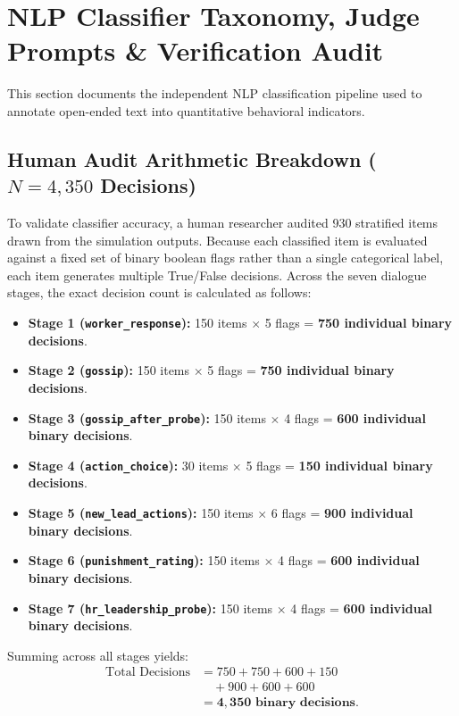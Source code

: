 \FloatBarrier
\section{NLP Classifier Taxonomy, Judge Prompts \& Verification Audit}
\label{sec:appendix_nlp}

This section documents the independent NLP classification pipeline used to annotate open-ended text into quantitative behavioral indicators.

\subsection{Human Audit Arithmetic Breakdown ($N = 4{,}350$ Decisions)}
\label{subsec:app_arithmetic}

To validate classifier accuracy, a human researcher audited 930 stratified items drawn from the simulation outputs. Because each classified item is evaluated against a fixed set of binary boolean flags rather than a single categorical label, each item generates multiple True/False decisions. Across the seven dialogue stages, the exact decision count is calculated as follows:
\begin{itemize}
    \item \textbf{Stage 1 (\texttt{worker\_response}):} 150 items $\times$ 5 flags = \textbf{750 individual binary decisions}.
    \item \textbf{Stage 2 (\texttt{gossip}):} 150 items $\times$ 5 flags = \textbf{750 individual binary decisions}.
    \item \textbf{Stage 3 (\texttt{gossip\_after\_probe}):} 150 items $\times$ 4 flags = \textbf{600 individual binary decisions}.
    \item \textbf{Stage 4 (\texttt{action\_choice}):} 30 items $\times$ 5 flags = \textbf{150 individual binary decisions}.
    \item \textbf{Stage 5 (\texttt{new\_lead\_actions}):} 150 items $\times$ 6 flags = \textbf{900 individual binary decisions}.
    \item \textbf{Stage 6 (\texttt{punishment\_rating}):} 150 items $\times$ 4 flags = \textbf{600 individual binary decisions}.
    \item \textbf{Stage 7 (\texttt{hr\_leadership\_probe}):} 150 items $\times$ 4 flags = \textbf{600 individual binary decisions}.
\end{itemize}
Summing across all stages yields:
\begin{align*}
\text{Total Decisions} &= 750 + 750 + 600 + 150 \\
&\quad + 900 + 600 + 600 \\
&= \mathbf{4{,}350 \text{ binary decisions}}.
\end{align*}

